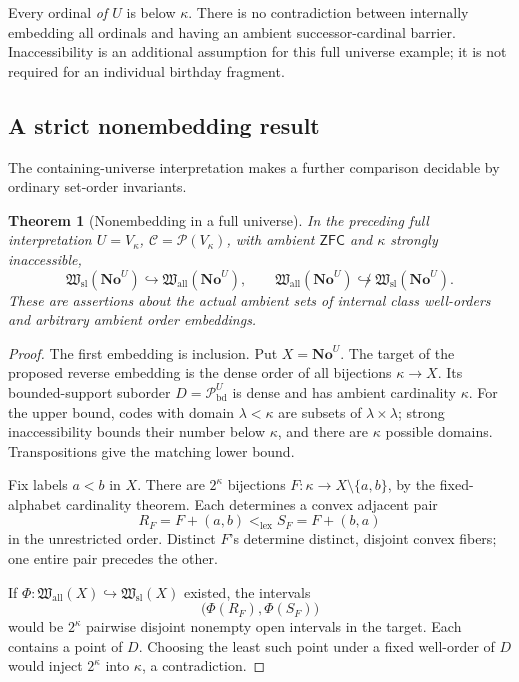 \documentclass[11pt]{article}
\newtheorem{theorem}{Theorem}[section]
\theoremstyle{definition}
\theoremstyle{remark}
\newcommand{\No}{\mathbf{No}}
\newcommand{\Hsl}{\mathfrak W_{\mathrm{sl}}}
\newcommand{\Hall}{\mathfrak W_{\mathrm{all}}}
\newcommand{\Pbd}{\mathcal P_{\mathrm{bd}}}
\newcommand{\lex}{\mathrm{lex}}
\newcommand{\emb}{\hookrightarrow}
\newcommand{\ZFC}{\mathsf{ZFC}}
\begin{document}
Every ordinal \emph{of \(U\)} is below \(\kappa\). There is no
contradiction between internally embedding all ordinals and
having an ambient successor-cardinal barrier. Inaccessibility
is an additional assumption for this full universe example;
it is not required for an individual birthday fragment.

\subsection{A strict nonembedding result}

The containing-universe interpretation makes a further comparison
decidable by ordinary set-order invariants.

\begin{theorem}[Nonembedding in a full universe]
\label{swo:thm:universe-nonembedding}
In the preceding full interpretation
\(U=V_\kappa\), \(\mathcal C=\mathcal P(V_\kappa)\), with ambient
\(\ZFC\) and \(\kappa\) strongly inaccessible,
\[
 \Hsl(\No^U)\emb\Hall(\No^U),
 \qquad
 \Hall(\No^U)\not\emb\Hsl(\No^U).
\]
These are assertions about the actual ambient sets of internal
class well-orders and arbitrary ambient order embeddings.
\end{theorem}

\begin{proof}
The first embedding is inclusion. Put \(X=\No^U\).
The target of the proposed reverse embedding is the dense order
of all bijections \(\kappa\to X\). Its bounded-support suborder
\(D=\Pbd^U\) is dense and has ambient cardinality \(\kappa\).
For the upper bound, codes with domain \(\lambda<\kappa\) are
subsets of \(\lambda\times\lambda\); strong inaccessibility bounds
their number below \(\kappa\), and there are \(\kappa\) possible
domains. Transpositions give the matching lower bound.

Fix labels \(a<b\) in \(X\). There are \(2^\kappa\) bijections
\(F:\kappa\to X\setminus\{a,b\}\), by the fixed-alphabet
cardinality theorem. Each determines a convex adjacent pair
\[
 R_F=F+(a,b)<_{\lex}S_F=F+(b,a)
\]
in the unrestricted order. Distinct \(F\)'s determine distinct,
disjoint convex fibers; one entire pair precedes the other.

If \(\Phi:\Hall(X)\emb\Hsl(X)\) existed, the intervals
\[
       \bigl(\Phi(R_F),\Phi(S_F)\bigr)
\]
would be \(2^\kappa\) pairwise disjoint nonempty open intervals
in the target. Each contains a point of \(D\). Choosing the
least such point under a fixed well-order of \(D\) would inject
\(2^\kappa\) into \(\kappa\), a contradiction.
\end{proof}
\end{document}
